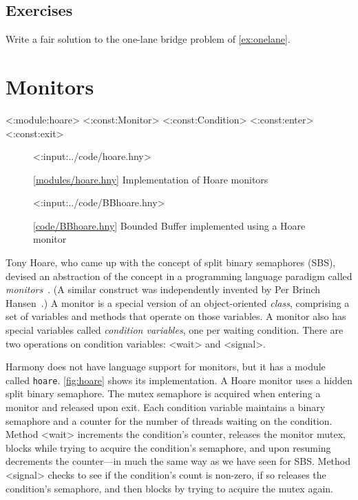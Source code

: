 \documentclass{report}
\newcommand{\harmonylink}[1]{%
[\href{https://harmony.cs.cornell.edu/#1}{\underline{#1}}]%
}
\newenvironment{code}{
\tcolorbox
}{
\endtcolorbox
}
\begin{document}
\section*{Exercises}
\begin{problems}
\item Write a fair solution to the one-lane bridge problem of
\autoref{ex:onelane}.
\end{problems}

\chapter{Monitors}
\label{ch:monitors}

<{:module:hoare}>
<{:const:Monitor}>
<{:const:Condition}>
<{:const:enter}>
<{:const:exit}>

%
%

\begin{figure}
\begin{code}
<{:input:../code/hoare.hny}>
\end{code}
\caption{\harmonylink{modules/hoare.hny} Implementation of Hoare monitors}
\label{fig:hoare}
\end{figure}

\begin{figure}
\begin{code}
<{:input:../code/BBhoare.hny}>
\end{code}
\caption{\harmonylink{code/BBhoare.hny} Bounded Buffer implemented using
a Hoare monitor}
\label{fig:hoaretest}
\end{figure}

Tony Hoare, who came up with the concept of split binary semaphores (SBS),
devised an abstraction of the concept in a programming language paradigm
called \emph{monitors}~\cite{Hoare74}.
%
(A similar construct was independently invented by Per Brinch Hansen~\cite{BH73}.)
A monitor is a special version of an object-oriented \emph{class}, comprising
a set of variables and methods that operate on those variables.
A monitor also has special variables called \emph{condition variables},
one per waiting condition.
There are two operations on condition variables: <{wait}>
%
and
<{signal}>.
%

Harmony does not have language support for monitors, but it
has a module called \texttt{hoare}.
\autoref{fig:hoare} shows its implementation.
A Hoare monitor uses a hidden split binary semaphore.
The mutex semaphore is acquired when entering a monitor and released
upon exit.
Each condition variable maintains a binary semaphore and a counter for
the number of threads waiting on the condition.
Method <{wait}> increments the condition's counter, releases the monitor mutex,
blocks while trying to acquire the condition's semaphore, and upon resuming
decrements the counter---in much the same way as we have seen for SBS.
Method <{signal}> checks to see if the condition's count is non-zero, if so
releases the condition's semaphore,
and then blocks by trying to acquire the mutex again.
\end{document}
